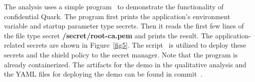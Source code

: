 
The analysis uses a simple program~\cite*{qualitativ_programs} to demonstrate the functionality of confidential Quark. The program first prints the application's environment variable and startup parameter type secrets. Then it reads the first few lines of the file type 
secret \textbf{/secret/root-ca.pem} and prints the result. The application-related secrets are shown in Figure~\ref{fig5}. The script~\cite*{secret_uploading_script} is utilized to deploy these secrets and the shield policy to the secret manager. Note that the program is already 
containerized. The artifacts for the demo in the qualitative analysis and the YAML files for deploying the demo can be found in commit~\cite*{artifacts_quarlitative}.

